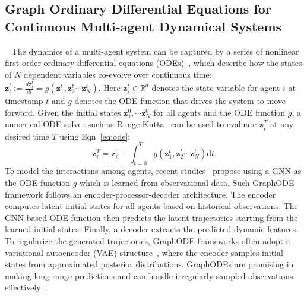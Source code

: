 \subsection{Graph Ordinary Differential Equations for
Continuous Multi-agent Dynamical Systems}~\label{sec:graphode}
The dynamics of a multi-agent system can be captured by a series of nonlinear first-order ordinary differential equations (ODEs)~\cite{latentODE,LG-ODE,huang2023generalizing, hope}, which describe how the states of $N$ dependent variables co-evolve over continuous time: $\dot{\bm{z}}_{i}^{t}:=\frac{d \bm{z}_{i}^{t}}{d t}=g\left(\bm{z}_{1}^{t}, \bm{z}_{2}^{t} \cdots \bm{z}_{N}^{t}\right)$. Here $\bm{z}_i^t\in\mathbb{R}^d$ denotes the state variable for agent $i$ at timestamp $t$ and $g$ denotes the ODE function that drives the system to move forward. Given the initial states $\bm{z}_{1}^{0}, 
\cdots \bm{z}_{N}^{0}$ for all agents and the ODE function $g$, a numerical ODE solver such as Runge-Kutta~\cite{solver} can be used to 
evaluate $\bm{z}_i^T$ at any desired time $T$ using Eqn~\eqref{eq:ode}: 
\begin{equation}
    \bm{z}_{i}^{T}=\bm{z}_{i}^{0}+\int_{t=0}^{T} g\left(\bm{z}_{1}^{t}, \bm{z}_{2}^{t} \cdots \bm{z}_{N}^{t}\right) \mathrm d t.
    \label{eq:ode}
\end{equation}
To model the interactions among agents, recent studies~\cite{LG-ODE,huang2021coupled,ndcn,poli2019graph} propose using a GNN as the ODE function $g$ which is learned from observational data. Such GraphODE framework follows an encoder-processor-decoder architecture. The encoder computes latent initial states for all agents based on historical observations. The GNN-based ODE function then predicts the latent trajectories starting from the learned initial states. Finally, a decoder extracts the predicted dynamic features. To regularize the generated trajectories, GraphODE frameworks often adopt a variational autoencoder (VAE) structure~\cite{VAE}, where the encoder samples initial states from approximated posterior distributions. GraphODEs are promising in making long-range predictions and can handle irregularly-sampled observations effectively~\cite{LG-ODE,ndcn}.


